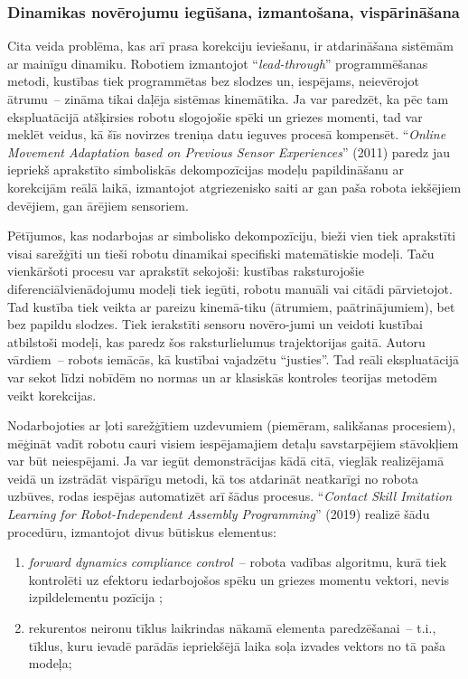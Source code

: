 \documentclass[12pt, a4paper]{article}
\numberwithin{equation}{section} %
\begin{document}
\subsubsection{Dinamikas novērojumu iegūšana, izmantošana, vispārināšana} 

Cita veida problēma, kas arī prasa korekciju ieviešanu, ir atdarināšana sistēmām ar mainīgu dinamiku. Robotiem izmantojot ``\textit{lead-through}'' programmēšanas metodi, kustības tiek programmētas bez slodzes un, iespējams, neievērojot ātrumu~-- zināma tikai daļēja sistēmas kinemātika. Ja var paredzēt, ka pēc tam ekspluatācijā atšķirsies robotu slogojošie spēki un griezes momenti, tad var meklēt veidus, kā šīs novirzes treniņa datu ieguves procesā kompensēt. ``\textit{Online Movement Adaptation based on Previous Sensor Experiences}'' \cite{pastor2011online} (2011) paredz jau iepriekš aprakstīto simboliskās dekompozīcijas modeļu papildināšanu ar korekcijām reālā laikā, izmantojot atgriezenisko saiti ar gan paša robota iekšējiem devējiem, gan ārējiem sensoriem. 

Pētījumos, kas nodarbojas ar simbolisko dekompozīciju, bieži vien tiek aprakstīti visai sarežģīti un tieši robotu dinamikai specifiski matemātiskie modeļi. Taču vienkāršoti procesu var aprakstīt sekojoši: kustības raksturojošie diferenciālvienādojumu modeļi tiek iegūti, robotu manuāli vai citādi pārvietojot. Tad kustība tiek veikta ar pareizu kinemā-tiku (ātrumiem, paātrinājumiem), bet bez papildu slodzes. Tiek ierakstīti sensoru novēro-jumi un veidoti kustībai atbilstoši modeļi, kas paredz šos raksturlielumus trajektorijas gaitā. Autoru vārdiem~-- robots iemācās, kā kustībai vajadzētu ``justies''. Tad reāli ekspluatācijā var sekot līdzi nobīdēm no normas un ar klasiskās kontroles teorijas metodēm veikt korekcijas.

Nodarbojoties ar ļoti sarežģītiem uzdevumiem (piemēram, salikšanas procesiem), mēģināt vadīt robotu cauri visiem iespējamajiem detaļu savstarpējiem stāvokļiem var būt neiespējami. Ja var iegūt demonstrācijas kādā citā, vieglāk realizējamā veidā un izstrādāt vispārīgu metodi, kā tos atdarināt neatkarīgi no robota uzbūves, rodas iespējas automatizēt arī šādus procesus. ``\textit{Contact Skill Imitation Learning for Robot-Independent Assembly Programming}'' \cite{scherzinger2019contact} (2019) realizē šādu procedūru, izmantojot divus būtiskus elementus:

\begin{enumerate}
    \item \textit{forward dynamics compliance control}~-- robota vadības algoritmu, kurā tiek kontrolēti uz efektoru iedarbojošos spēku un griezes momentu vektori, nevis izpildelementu pozīcija \cite{scherzinger2017forward};
    \item rekurentos neironu tīklus laikrindas nākamā elementa paredzēšanai~-- t.i., tīklus, kuru ievadē parādās iepriekšējā laika soļa izvades vektors no tā paša modeļa;
\end{enumerate}
\end{document}
